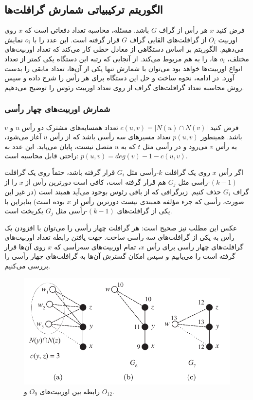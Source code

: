 \subsection{الگوریتم ترکیبیاتی شمارش گرافلت‌ها}
فرض کنید $x$ هر رأس از گراف $G$ باشد. مسئله، محاسبه تعداد دفعاتی است که $x$  روی اوربیت $O_i$ از گرافلت‌های القایی گراف $G$ قرار گرفته است. این عدد را با $o_i$ نمایش می‌دهیم. الگوریتم بر اساس دستگاهی از معادل خطی کار می‌کند که تعداد اوربیت‌های مختلف، $o_i$ ها، را به هم مربوط می‌کند. از آنجایی که رتبه این دستگاه یکی کمتر از تعداد انواع اوربیت‌ها خواهد بود می‌توان با شمارش تنها یکی از آن‌ها، تعداد مابقی را بدست آورد. در ادامه، نحوه ساخت و حل این دستگاه برای هر رأس را شرح داده و سپس روش محاسبه تعداد گرافلت‌های گراف از روی تعداد اوربیت رئوس را توضیح می‌دهیم.

\subsubsection{شمارش اوربیت‌های چهار رأسی}
فرض کنید $c(u,v) = |N(u) \cap N(v)|$ تعداد همسایه‌های مشترک دو رأس $u$ و $v$ باشد. همینطور $p(u,v)$ تعداد مسیرهای سه رأسی باشد که از رأس $u$ آغاز می‌شود، به رأس $v$ می‌رود و در رأسی مثل $t$ که به $u$ متصل نیست، پایان می‌یابد. این عدد به راحتی قابل محاسبه است: 
$p(u,v) = deg(v) -1 -c(u,v)$.

اگر رأس $x$ روی یک گرافلت $k$-رأسی مثل $G_i$ قرار گرفته باشد، حتماً روی یک گرافلت $(k-1)$-رأسی مثل $G_j$ هم قرار گرفته است، کافی است دورترین رأس از $x$ را از گراف $G_i$ حذف کنیم. زیرگرافی که از باقی رئوس بوجود می‌آید همبند است (در غیر این صورت، رأسی که جزء مؤلفه همبندی نیست دورترین رأس از $x$ بوده است) بنابراین با یکی از گرافلت‌های $(k-1)$-رأسی مثل $G_j$ یکریخت است.

عکس این مطلب نیز صحیح است: هر گرافلت چهار رأسی را می‌توان با افزودن یک رأس به یکی از گرافلت‌های سه رأسی ساخت. جهت یافتن رابطه تعداد اوربیت‌های گرافلت‌های چهار رأسی برای رأس $x$، تمام اوربیت‌های سه‌رأسی که $x$ روی آن‌ها قرار گرفته است را می‌یابیم و سپس امکان گسترش آن‌ها به گرافلت‌های چهار رأسی را بررسی می‌کنیم.

\begin{figure}[ht]
\centering
\includegraphics[scale=0.3]{./4-node-graphlet-1.png}
\caption{رابطه بین اوربیت‌های $O_9$ و $O_{12}$.}
\label{fig:o9-o12-relation}
\end{figure}

